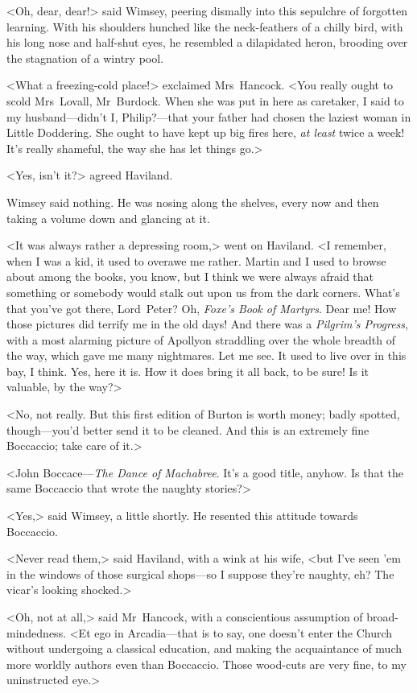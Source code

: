 <Oh, dear, dear!> said Wimsey, peering dismally into this sepulchre of forgotten learning. With his shoulders hunched like the neck-feathers of a chilly bird, with his long nose and half-shut eyes, he resembled a dilapidated heron, brooding over the stagnation of a wintry pool.

<What a freezing-cold place!> exclaimed Mrs~Hancock. <You really ought to scold Mrs~Lovall, Mr~Burdock. When she was put in here as caretaker, I said to my husband—didn't I, Philip?—that your father had chosen the laziest woman in Little Doddering. She ought to have kept up big fires here, \textit{at least} twice a week! It's really shameful, the way she has let things go.>

<Yes, isn't it?> agreed Haviland.

Wimsey said nothing. He was nosing along the shelves, every now and then taking a volume down and glancing at it.

<It was always rather a depressing room,> went on Haviland. <I remember, when I was a kid, it used to overawe me rather. Martin and I used to browse about among the books, you know, but I think we were always afraid that something or somebody would stalk out upon us from the dark corners. What's that you've got there, Lord~Peter? Oh, \textit{Foxe's Book of Martyrs}. Dear me! How those pictures did terrify me in the old days! And there was a \textit{Pilgrim's Progress}, with a most alarming picture of Apollyon straddling over the whole breadth of the way, which gave me many nightmares. Let me see. It used to live over in this bay, I think. Yes, here it is. How it does bring it all back, to be sure! Is it valuable, by the way?>

<No, not really. But this first edition of Burton is worth money; badly spotted, though—you'd better send it to be cleaned. And this is an extremely fine Boccaccio; take care of it.>

<John Boccace—\textit{The Dance of Machabree}. It's a good title, anyhow. Is that the same Boccaccio that wrote the naughty stories?>

<Yes,> said Wimsey, a little shortly. He resented this attitude towards Boccaccio.

<Never read them,> said Haviland, with a wink at his wife, <but I've seen 'em in the windows of those surgical shops—so I suppose they're naughty, eh? The vicar's looking shocked.>

<Oh, not at all,> said Mr~Hancock, with a conscientious assumption of broad-mindedness. <Et ego in Arcadia—that is to say, one doesn't enter the Church without undergoing a classical education, and making the acquaintance of much more worldly authors even than Boccaccio. Those wood-cuts are very fine, to my uninstructed eye.>

